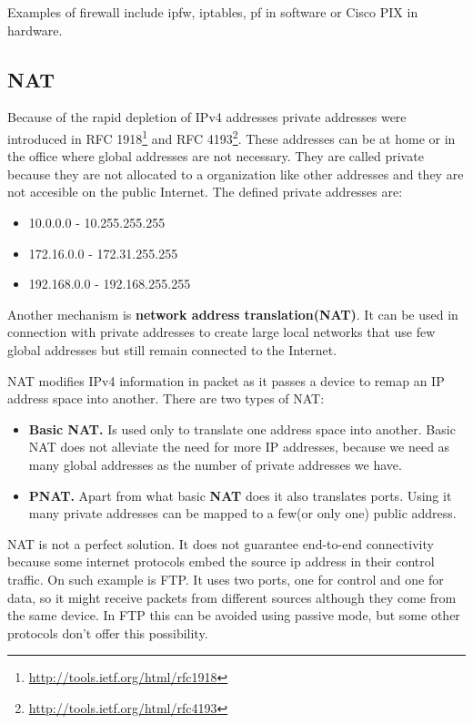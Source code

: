 Examples of firewall include ipfw, iptables, pf in software or Cisco PIX in hardware.


\subsection{NAT}
\label{sub-sec:nat}

Because of the rapid depletion of IPv4 addresses private addresses were introduced in RFC 1918\footnote{\url{http://tools.ietf.org/html/rfc1918}}
 and RFC 4193\footnote{\url{http://tools.ietf.org/html/rfc4193}}. These addresses can be at home or in the office
where global addresses are not necessary. They are called private because they are not allocated to a organization like
other addresses and they are not accesible on the public Internet. The defined private addresses are:
\begin{itemize}
  \item 10.0.0.0 - 10.255.255.255
  \item 172.16.0.0 - 172.31.255.255
  \item 192.168.0.0 - 192.168.255.255
\end{itemize}

Another mechanism is \textbf{network address translation(NAT)}. It can be used in connection with private addresses to create
large local networks that use few global addresses but still remain connected to the Internet. 

NAT modifies IPv4 information in packet as it passes a device to remap an IP address space into another. There are two types of
NAT:
\begin{itemize}
  \item \textbf{Basic NAT.} Is used only to translate one address space into another. Basic NAT does not alleviate the need
for more IP addresses, because we need as many global addresses as the number of private addresses we have.
  \item \textbf{PNAT.} Apart from what basic \textbf{NAT} does it also translates ports. Using it many private addresses can be mapped
to a few(or only one) public address.
\end{itemize}


NAT is not a perfect solution. It does not guarantee end-to-end connectivity because some internet protocols embed the source
ip address in their control traffic. On such example is FTP. It uses two ports, one for control and one for data, so it might receive
packets from different sources although they come from the same device. In FTP this can be avoided using passive mode, but some other protocols
don't offer this possibility.

